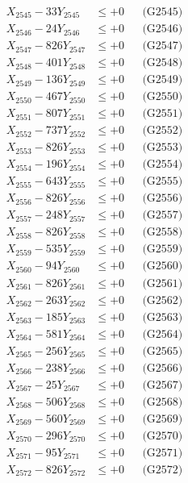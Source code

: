 \documentclass[a4paper,10pt]{article}
\begin{document}
{\begin{align}
X_{2545} - 33Y_{2545} &\leq +0 && \text{(G2545)} \\
X_{2546} - 24Y_{2546} &\leq +0 && \text{(G2546)} \\
X_{2547} - 826Y_{2547} &\leq +0 && \text{(G2547)} \\
X_{2548} - 401Y_{2548} &\leq +0 && \text{(G2548)} \\
X_{2549} - 136Y_{2549} &\leq +0 && \text{(G2549)} \\
X_{2550} - 467Y_{2550} &\leq +0 && \text{(G2550)} \\
\allowbreak
X_{2551} - 807Y_{2551} &\leq +0 && \text{(G2551)} \\
X_{2552} - 737Y_{2552} &\leq +0 && \text{(G2552)} \\
X_{2553} - 826Y_{2553} &\leq +0 && \text{(G2553)} \\
X_{2554} - 196Y_{2554} &\leq +0 && \text{(G2554)} \\
X_{2555} - 643Y_{2555} &\leq +0 && \text{(G2555)} \\
X_{2556} - 826Y_{2556} &\leq +0 && \text{(G2556)} \\
X_{2557} - 248Y_{2557} &\leq +0 && \text{(G2557)} \\
X_{2558} - 826Y_{2558} &\leq +0 && \text{(G2558)} \\
X_{2559} - 535Y_{2559} &\leq +0 && \text{(G2559)} \\
X_{2560} - 94Y_{2560} &\leq +0 && \text{(G2560)} \\
\allowbreak
X_{2561} - 826Y_{2561} &\leq +0 && \text{(G2561)} \\
X_{2562} - 263Y_{2562} &\leq +0 && \text{(G2562)} \\
X_{2563} - 185Y_{2563} &\leq +0 && \text{(G2563)} \\
X_{2564} - 581Y_{2564} &\leq +0 && \text{(G2564)} \\
X_{2565} - 256Y_{2565} &\leq +0 && \text{(G2565)} \\
X_{2566} - 238Y_{2566} &\leq +0 && \text{(G2566)} \\
X_{2567} - 25Y_{2567} &\leq +0 && \text{(G2567)} \\
X_{2568} - 506Y_{2568} &\leq +0 && \text{(G2568)} \\
X_{2569} - 560Y_{2569} &\leq +0 && \text{(G2569)} \\
X_{2570} - 296Y_{2570} &\leq +0 && \text{(G2570)} \\
\allowbreak
X_{2571} - 95Y_{2571} &\leq +0 && \text{(G2571)} \\
X_{2572} - 826Y_{2572} &\leq +0 && \text{(G2572)} \\

\end{align}}
\end{document}
